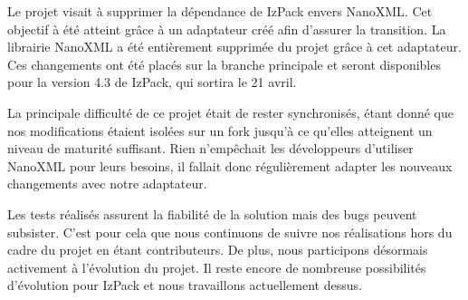 Le projet visait à supprimer la dépendance de IzPack envers NanoXML.
Cet objectif à été atteint grâce à un adaptateur créé afin d'assurer la transition.
La librairie NanoXML a été entièrement supprimée du projet grâce à cet adaptateur.
Ces changements ont été placés sur la branche principale et seront disponibles pour la version 4.3 de IzPack, qui sortira le 21 avril.

La principale difficulté de ce projet était de rester synchronisés, étant donné que nos modifications étaient isolées sur un fork jusqu'à ce qu'elles atteignent un niveau de maturité suffisant.
Rien n'empêchait les développeurs d'utiliser NanoXML pour leurs besoins, il fallait donc régulièrement adapter les nouveaux changements avec notre adaptateur.

Les tests réalisés assurent la fiabilité de la solution mais des bugs peuvent subsister.
C'est pour cela que nous continuons de suivre nos réalisations hors du cadre du projet en étant contributeurs.
De plus, nous participons désormais activement à l'évolution du projet.
Il reste encore de nombreuse possibilités d'évolution pour IzPack et nous travaillons actuellement dessus.
